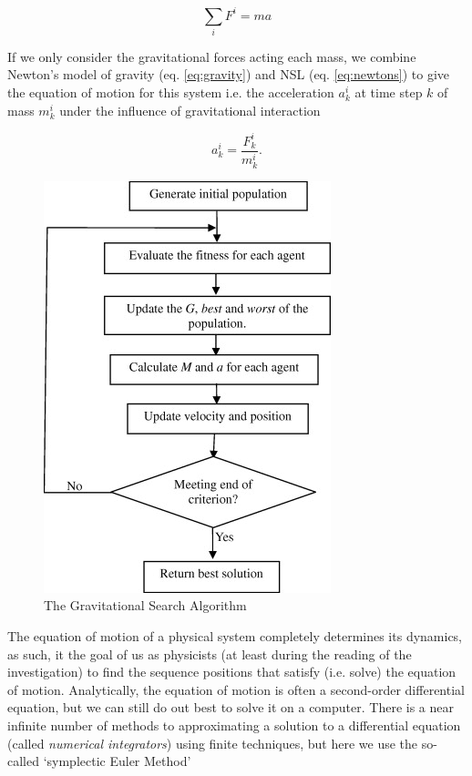 \documentclass{article}
\begin{document}
            \begin{equation}\label{eq:newtons}
                \sum_i F^i = m a
            \end{equation}

            If we only consider the gravitational forces acting each mass, we combine Newton's model of gravity (eq. \ref{eq:gravity}) and NSL (eq. \ref{eq:newtons}) to give the equation of motion for this system i.e. the acceleration $a_k^i$ at time step $k$ of mass $m_k^i$ under the influence of gravitational interaction

            \begin{equation}\label{eq:eom}
                a_k^i = \frac{F_k^i}{m_k^i}.
            \end{equation}

            \begin{figure}
                \begin{center}
                    \includegraphics{images/GSA.jpg}
                \end{center}
                \caption{The Gravitational Search Algorithm}
            \end{figure}

            The equation of motion of a physical system completely determines its dynamics, as such, it the goal of us as physicists (at least during the reading of the investigation) to find the sequence positions that satisfy (i.e. solve) the equation of motion.  Analytically, the equation of motion is often a second-order differential equation, but we can still do out best to solve it on a computer.  There is a near infinite number of methods to approximating a solution to a differential equation (called \emph{numerical integrators}) using finite techniques, but here we use the so-called `symplectic Euler Method'
\end{document}
